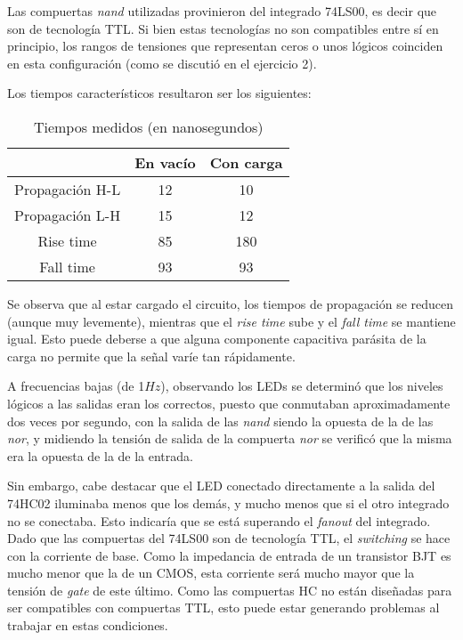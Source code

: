 \documentclass[../../e3_tp2_main.tex]{subfiles}
\begin{document}
Las compuertas \textit{nand} utilizadas provinieron del integrado 74LS00, es decir que son de tecnolog\'ia TTL. Si bien estas tecnolog\'ias no son compatibles entre s\'i en principio, los rangos de tensiones que representan ceros o unos l\'ogicos coinciden en esta configuraci\'on (como se discuti\'o en el ejercicio 2). \par

Los tiempos caracter\'isticos resultaron ser los siguientes:

\begin{table}[H]
	\centering
	\begin{tabular}{|c|c|c|}
	\hline
                  			& En vac\'io	& Con carga	\\ \hline \hline
	Propagaci\'on H-L	& 12   		& 10            	\\ \hline
	Propagaci\'on L-H 	& 15    		& 12           	\\ \hline
	Rise time         		& 85        		& 180                \\ \hline
	Fall time         		& 93        		& 93               	\\ \hline
	\end{tabular}
	\caption{Tiempos medidos (en nanosegundos)}
	\label{fig:2-circuito}
\end{table}

Se observa que al estar cargado el circuito, los tiempos de propagaci\'on se reducen (aunque muy levemente), mientras que el \textit{rise time} sube y el \textit{fall time} se mantiene igual. Esto puede deberse a que alguna componente capacitiva par\'asita de la carga no permite que la se\~nal var\'ie tan r\'apidamente. \par 

A frecuencias bajas (de 1$Hz$), observando los LEDs se determin\'o que los niveles l\'ogicos a las salidas eran los correctos, puesto que conmutaban aproximadamente dos veces por segundo, con la salida de las \textit{nand} siendo la opuesta de la de las \textit{nor}, y midiendo la tensi\'on de salida de la compuerta \textit{nor} se verific\'o que la misma era la opuesta de la de la entrada.\par

Sin embargo, cabe destacar que el LED conectado directamente a la salida del 74HC02 iluminaba menos que los dem\'as, y mucho menos que si el otro integrado no se conectaba. Esto indicar\'ia que se est\'a superando el \textit{fanout} del integrado. Dado que las compuertas del 74LS00 son de tecnolog\'ia TTL, el \textit{switching} se hace con la corriente de base. Como la impedancia de entrada de un transistor BJT es mucho menor que la de un CMOS, esta corriente ser\'a mucho mayor que la tensi\'on de \textit{gate} de este \'ultimo. Como las compuertas HC no est\'an dise\~nadas para ser compatibles con compuertas TTL, esto puede estar generando problemas al trabajar en estas condiciones.\par
\end{document}
